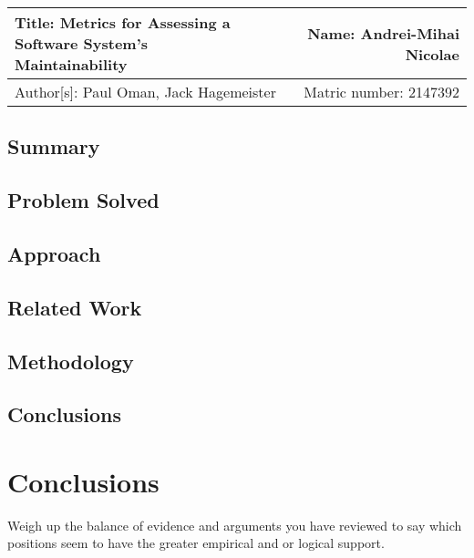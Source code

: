 \documentclass[a4paper,portrait,12pt]{article}
\begin{document}
 \begin{center}
   \begin{tabular}{ | l | r | }
    \hline
    \parbox[t]{5cm}{Title: Metrics for Assessing a Software System's
                    \\  Maintainability} 
     & Name: Andrei-Mihai Nicolae \\ 
     \hline
     Author[s]: Paul Oman, Jack Hagemeister & Matric number: 2147392 \\
    \hline
   \end{tabular}
 \end{center}

\subsection{Summary}



\subsection{Problem Solved}

\subsection{Approach}

\subsection{Related Work}

\subsection{Methodology}

\subsection{Conclusions}

\section{Conclusions}

Weigh up the balance of evidence and arguments you have reviewed to say which
positions seem to have the greater empirical and or logical support.



\end{document}
